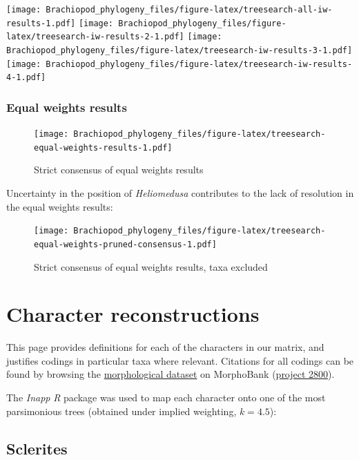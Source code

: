\documentclass[openany]{book}
\theoremstyle{definition}
\theoremstyle{definition}
\theoremstyle{definition}
\theoremstyle{remark}
\begin{document}
\texttt{[image: Brachiopod\_phylogeny\_files/figure-latex/treesearch-all-iw-results-1.pdf]}
\texttt{[image: Brachiopod\_phylogeny\_files/figure-latex/treesearch-iw-results-2-1.pdf]}
\texttt{[image: Brachiopod\_phylogeny\_files/figure-latex/treesearch-iw-results-3-1.pdf]}
\texttt{[image: Brachiopod\_phylogeny\_files/figure-latex/treesearch-iw-results-4-1.pdf]}

\hypertarget{equal-weights-results}{%
\subsection{Equal weights results}\label{equal-weights-results}}

\begin{figure}
\centering
\texttt{[image: Brachiopod\_phylogeny\_files/figure-latex/treesearch-equal-weights-results-1.pdf]}
\caption{\label{fig:treesearch-equal-weights-results}Strict consensus of
equal weights results}
\end{figure}

Uncertainty in the position of \emph{Heliomedusa} contributes to the
lack of resolution in the equal weights results:

\begin{figure}
\centering
\texttt{[image: Brachiopod\_phylogeny\_files/figure-latex/treesearch-equal-weights-pruned-consensus-1.pdf]}
\caption{\label{fig:treesearch-equal-weights-pruned-consensus}Strict
consensus of equal weights results, taxa excluded}
\end{figure}

\hypertarget{reconstructions}{%
\chapter{Character reconstructions}\label{reconstructions}}

This page provides definitions for each of the characters in our matrix,
and justifies codings in particular taxa where relevant. Citations for
all codings can be found by browsing the
\protect\hyperlink{dataset}{morphological dataset} on MorphoBank
(\href{https://morphobank.org/permalink/?P2800}{project 2800}).

The \emph{Inapp} \emph{R} package \citep{Brazeau2018} was used to map
each character onto one of the most parsimonious trees (obtained under
implied weighting, \(k = 4.5\)):

\hypertarget{sclerites}{%
\section{Sclerites}\label{sclerites}}
\end{document}
